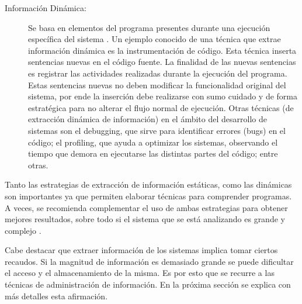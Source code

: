 \begin{description}
\item[Información Dinámica:] Se basa en elementos del programa presentes durante una ejecución específica del sistema \cite{THBE99}. Un ejemplo conocido de una técnica que extrae información dinámica es la instrumentación de código. Esta técnica inserta sentencias nuevas en el código fuente. La finalidad de las nuevas sentencias es registrar las actividades realizadas durante la ejecución del programa. 
Estas sentencias nuevas no deben modificar la funcionalidad original del sistema, por ende la inserción debe realizarse con sumo cuidado y de forma estratégica para no alterar el flujo normal de ejecución.
Otras técnicas (de extracción dinámica de información) en el ámbito del desarrollo de sistemas son el debugging, que sirve para identificar errores (bugs) en el código; el profiling, que ayuda a optimizar los sistemas, observando el tiempo que demora en ejecutarse las distintas partes del código; entre otras.

\end{description}

Tanto las estrategias de extracción de información estáticas, como las dinámicas son importantes ya que permiten elaborar técnicas para comprender programas. A veces, se recomienda complementar el uso de ambas estrategias para obtener mejores resultados, sobre todo si el sistema que se está analizando es grande y complejo \cite{TERD01}.


Cabe destacar que extraer información de los sistemas implica tomar ciertos recaudos. Si la magnitud de información es demasiado grande se puede dificultar el acceso y el almacenamiento de la misma. Es por esto que se recurre a las técnicas de administración de información. En la próxima sección se explica con más detalles esta afirmación.

